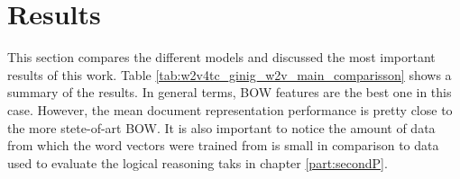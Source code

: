 






\section{Results}
\label{sec:w2v4tc_results}

This section compares the different models and discussed the most important
results of this work.  Table \ref{tab:w2v4tc_ginig_w2v_main_comparisson}
shows a summary of the results.  In general terms,  \ac{BOW} features are the
best one in this case. However, the mean document representation performance
is pretty close to the more stete-of-art \ac{BOW}. It is also important to
notice the amount of data from which the word  vectors were trained from is
small in comparison to data used to evaluate the logical reasoning taks in
chapter \ref{part:secondP}. 

